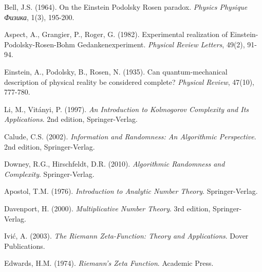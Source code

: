 \documentclass[12pt]{article}
\theoremstyle{plain}
\theoremstyle{definition}
\begin{document}
\begin{thebibliography}{99}
 Bell, J.S. (1964). On the Einstein Podolsky Rosen paradox. \emph{Physics Physique Физика}, 1(3), 195-200.

 Aspect, A., Grangier, P., Roger, G. (1982). Experimental realization of Einstein-Podolsky-Rosen-Bohm Gedankenexperiment. \emph{Physical Review Letters}, 49(2), 91-94.

 Einstein, A., Podolsky, B., Rosen, N. (1935). Can quantum-mechanical description of physical reality be considered complete? \emph{Physical Review}, 47(10), 777-780.

 Li, M., Vitányi, P. (1997). \emph{An Introduction to Kolmogorov Complexity and Its Applications}. 2nd edition, Springer-Verlag.

 Calude, C.S. (2002). \emph{Information and Randomness: An Algorithmic Perspective}. 2nd edition, Springer-Verlag.

 Downey, R.G., Hirschfeldt, D.R. (2010). \emph{Algorithmic Randomness and Complexity}. Springer-Verlag.

 Apostol, T.M. (1976). \emph{Introduction to Analytic Number Theory}. Springer-Verlag.

 Davenport, H. (2000). \emph{Multiplicative Number Theory}. 3rd edition, Springer-Verlag.

 Ivić, A. (2003). \emph{The Riemann Zeta-Function: Theory and Applications}. Dover Publications.

 Edwards, H.M. (1974). \emph{Riemann's Zeta Function}. Academic Press.

\end{thebibliography}
\end{document}
